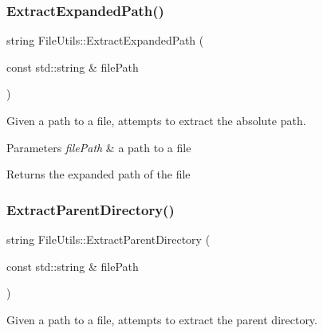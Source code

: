 \subsubsection{\texorpdfstring{Extract\+Expanded\+Path()}{ExtractExpandedPath()}}
{\footnotesize\ttfamily string File\+Utils\+::\+Extract\+Expanded\+Path (\begin{DoxyParamCaption}\item[{const std\+::string \&}]{file\+Path }\end{DoxyParamCaption})\hspace{0.3cm}{\ttfamily [static]}}



Given a path to a file, attempts to extract the absolute path. 


\begin{DoxyParams}{Parameters}
{\em file\+Path} & a path to a file \\
\hline
\end{DoxyParams}
\begin{DoxyReturn}{Returns}
the expanded path of the file 
\end{DoxyReturn}
\mbox{\label{class_aws_1_1_iot_1_1_device_client_1_1_util_1_1_file_utils_a137435480bde485798fe38cb63ae6b0d}} 
\subsubsection{\texorpdfstring{Extract\+Parent\+Directory()}{ExtractParentDirectory()}}
{\footnotesize\ttfamily string File\+Utils\+::\+Extract\+Parent\+Directory (\begin{DoxyParamCaption}\item[{const std\+::string \&}]{file\+Path }\end{DoxyParamCaption})\hspace{0.3cm}{\ttfamily [static]}}



Given a path to a file, attempts to extract the parent directory. 


